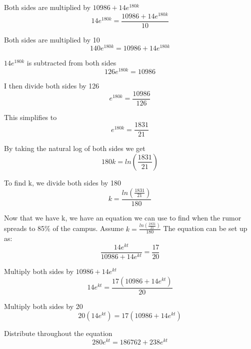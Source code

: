 \documentclass[12pt]{article}
\begin{document}
Both sides are multiplied by $10986+14e^{180k}$
\begin{equation*}
14e^{180k} = \frac{10986+14e^{180k}}{10}
\end{equation*}

Both sides are multiplied by 10
\begin{equation*}
140e^{180k} = 10986+14e^{180k}
\end{equation*}

$14e^{180k}$ is subtracted from both sides
\begin{equation*}
126e^{180k} = 10986
\end{equation*}

I then divide both sides by 126
\begin{equation*}
e^{180k} = \frac{10986}{126}
\end{equation*}

This simplifies to
\begin{equation*}
e^{180k} = \frac{1831}{21}
\end{equation*}

By taking the natural log of both sides we get 
\begin{equation*}
180k = ln(\frac{1831}{21})
\end{equation*}

To find k, we divide both sides by 180
\begin{equation*}
k = \frac{ln(\frac{1831}{21})}{180}
\end{equation*}

Now that we have k, we have an equation we can use to find when the
rumor spreads to 85\% of the campus. Assume $k = \frac{ln(\frac{1831}{21})}{180}$ The equation can be set up as:
\begin{equation*}
\frac{14e^{kt}}{10986+14e^{kt}} = \frac{17}{20}
\end{equation*}

Multiply both sides by $10986+14e^{kt}$
\begin{equation*}
14e^{kt} = \frac{17(10986+14e^{kt})}{20}
\end{equation*}

Multiply both sides by 20
\begin{equation*}
20(14e^{kt}) = 17(10986+14e^{kt})
\end{equation*}

Distribute throughout the equation
\begin{equation*}
280e^{kt} = 186762+238e^{kt}
\end{equation*}
\end{document}
